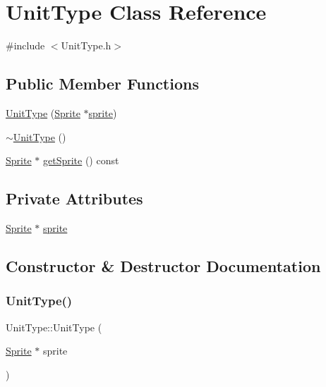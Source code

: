 \hypertarget{class_unit_type}{}\section{Unit\+Type Class Reference}
\label{class_unit_type}


{\ttfamily \#include $<$Unit\+Type.\+h$>$}

\subsection*{Public Member Functions}
\begin{DoxyCompactItemize}
\item 
\hyperlink{class_unit_type_a6d11faab12b8ee66423a63a2414e668f}{Unit\+Type} (\hyperlink{class_sprite}{Sprite} $\ast$\hyperlink{class_unit_type_a6e361b921f79f39f082a761feb271ba1}{sprite})
\item 
\hyperlink{class_unit_type_a0b72d6463ffb729f9cf8b6b5cb3688b0}{$\sim$\+Unit\+Type} ()
\item 
\hyperlink{class_sprite}{Sprite} $\ast$ \hyperlink{class_unit_type_aa4fb91abbe5f1982764c447251e31cf8}{get\+Sprite} () const
\end{DoxyCompactItemize}
\subsection*{Private Attributes}
\begin{DoxyCompactItemize}
\item 
\hyperlink{class_sprite}{Sprite} $\ast$ \hyperlink{class_unit_type_a6e361b921f79f39f082a761feb271ba1}{sprite}
\end{DoxyCompactItemize}


\subsection{Constructor \& Destructor Documentation}
\mbox{\label{class_unit_type_a6d11faab12b8ee66423a63a2414e668f}} 
\subsubsection{\texorpdfstring{Unit\+Type()}{UnitType()}}
{\footnotesize\ttfamily Unit\+Type\+::\+Unit\+Type (\begin{DoxyParamCaption}\item[{\hyperlink{class_sprite}{Sprite} $\ast$}]{sprite }\end{DoxyParamCaption})}

